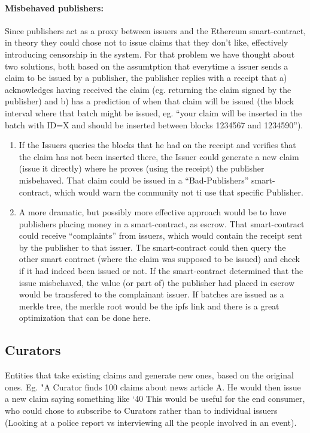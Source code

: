 \paragraph{Misbehaved publishers: } Since publishers act as a proxy between issuers and the Ethereum smart-contract, in theory they could chose not to issue claims that they don’t like, effectively introducing censorship in the system. For that problem we have thought about two solutions, both based on the assumtption that everytime a issuer sends a claim to be issued by a publisher, the publisher replies with a receipt that a) acknowledges having received the claim (eg. returning the claim signed by the publisher) and b) has a prediction of when that claim will be issued (the block interval where that batch might be issued, eg. “your claim will be inserted in the batch with ID=X and should be inserted between blocks 1234567 and 1234590”).
\begin{enumerate}
    \item If the Issuers queries the blocks that he had on the receipt and verifies that the claim has not been inserted there, the Issuer could generate a new claim (issue it directly) where he proves (using the receipt) the publisher misbehaved. That claim could be issued in a “Bad-Publishers” smart-contract, which would warn the community not ti use that specific Publisher.
    \item A more dramatic, but possibly more effective approach would be to have publishers placing money in a smart-contract, as escrow. That smart-contract could receive “complaints” from issuers, which would contain the receipt sent by the publisher to that issuer. The smart-contract could then query the other smart contract (where the claim was supposed to be issued) and check if it had indeed been issued or not. If the smart-contract determined that the issue misbehaved, the value (or part of) the publisher had placed in escrow would be transfered to the complainant issuer. If batches are issued as a merkle tree, the merkle root would be the ipfs link and there is a great optimization that can be done here.
\end{enumerate}

\subsection{Curators}
Entities that take existing claims and generate new ones, based on the original ones.
Eg. "A Curator finds 100 claims about news article A. He would then issue a new claim saying something like ‘40%
This would be useful for the end consumer, who could chose to subscribe to Curators rather than to individual issuers (Looking at a police report vs interviewing all the people involved in an event).

